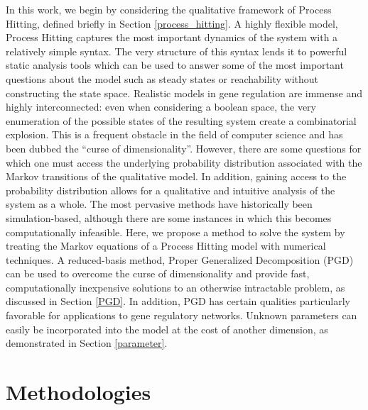 \documentclass{article}
\begin{document}
In this work, we begin by considering the qualitative framework of Process Hitting, defined briefly in Section \ref{process_hitting}. A highly flexible model, Process Hitting captures the most important dynamics of the system with a relatively simple syntax. The very structure of this syntax lends it to powerful static analysis tools which can be used to answer some of the most important questions about the model such as steady states or reachability without constructing the state space. Realistic models in gene regulation are immense and highly interconnected: even when considering a boolean space, the very enumeration of the possible states of the resulting system create a combinatorial explosion. This is a frequent obstacle in the field of computer science and has been dubbed the ``curse of dimensionality''. However, there are some questions for which one must access the underlying probability distribution associated with the Markov transitions of the qualitative model. In addition, gaining access to the probability distribution allows for a qualitative and intuitive analysis of the system as a whole. The most pervasive methods have historically been simulation-based, although there are some instances in which this becomes computationally infeasible. Here, we propose a method to solve the system by treating the Markov equations of a Process Hitting model with numerical techniques. A reduced-basis method, Proper Generalized Decomposition (PGD) can be used to overcome the curse of dimensionality and provide fast, computationally inexpensive solutions to an otherwise intractable problem, as discussed in Section \ref{PGD}. In addition, PGD has certain qualities particularly favorable for applications to gene regulatory networks. Unknown parameters can easily be incorporated into the model at the cost of another dimension, as demonstrated in Section \ref{parameter}.


\section{Methodologies}
\end{document}
